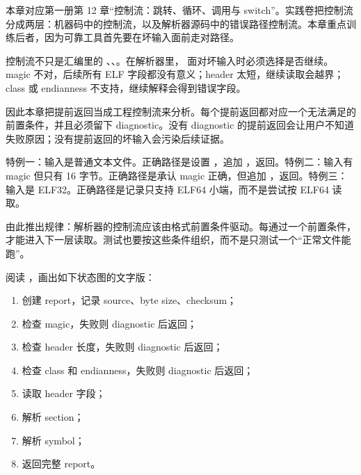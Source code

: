 
本章对应第一册第 12 章“控制流：跳转、循环、调用与 switch”。实践卷把控制流分成两层：机器码中的控制流，以及解析器源码中的错误路径控制流。本章重点训练后者，因为可靠工具首先要在坏输入面前走对路径。


控制流不只是汇编里的 、、。在解析器里， 面对坏输入时必须选择是否继续。magic 不对，后续所有 ELF 字段都没有意义；header 太短，继续读取会越界；class 或 endianness 不支持，继续解释会得到错误字段。

因此本章把提前返回当成工程控制流来分析。每个提前返回都对应一个无法满足的前置条件，并且必须留下 diagnostic。没有 diagnostic 的提前返回会让用户不知道失败原因；没有提前返回的坏输入会污染后续证据。


特例一：输入是普通文本文件。正确路径是设置 ，追加 ，返回。特例二：输入有 magic 但只有 16 字节。正确路径是承认 magic 正确，但追加 ，返回。特例三：输入是 ELF32。正确路径是记录只支持 ELF64 小端，而不是尝试按 ELF64 读取。

由此推出规律：解析器的控制流应该由格式前置条件驱动。每通过一个前置条件，才能进入下一层读取。测试也要按这些条件组织，而不是只测试一个“正常文件能跑”。


阅读 ，画出如下状态图的文字版：

\begin{enumerate}
  \item 创建 report，记录 source、byte size、checksum；
  \item 检查 magic，失败则 diagnostic 后返回；
  \item 检查 header 长度，失败则 diagnostic 后返回；
  \item 检查 class 和 endianness，失败则 diagnostic 后返回；
  \item 读取 header 字段；
  \item 解析 section；
  \item 解析 symbol；
  \item 返回完整 report。
\end{enumerate}

